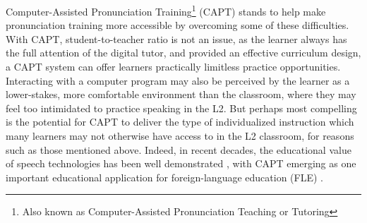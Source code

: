 Computer-Assisted Pronunciation Training\footnote{Also known as Computer-Assisted Pronunciation Teaching or Tutoring} (CAPT) stands to help make pronunciation training more accessible by overcoming some of these difficulties. 
With CAPT, student-to-teacher ratio is not an issue, as the learner always has the full attention of the digital tutor, and provided an effective curriculum design, a CAPT system can offer learners practically limitless practice opportunities. Interacting with a computer program may also be perceived by the learner as a lower-stakes, more comfortable environment than the classroom, where they may feel too intimidated to practice speaking in the L2. But perhaps most compelling is the potential for CAPT 
to deliver the type of individualized instruction
which many learners may not otherwise have access to in the L2 classroom, for reasons such as those mentioned above.
%
Indeed, in recent decades, the educational value of speech technologies has been well demonstrated \citep{Eskenazi2009}, with CAPT emerging as one important educational application for foreign-language education (FLE) \citep{Neri2002,Delmonte2011,Witt2012}. 
%
%	
%
%
%	
%	
	\label{sec:capt:systems}
		
